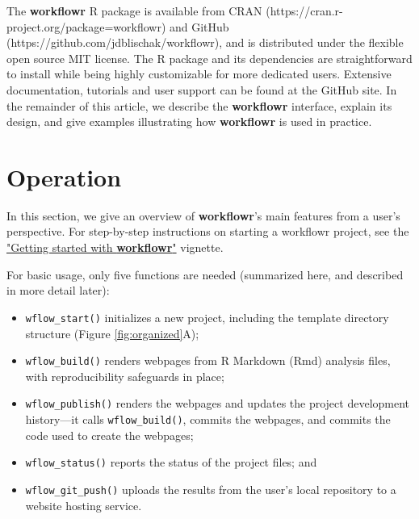 \documentclass[9pt,a4paper]{extarticle}
\begin{document}
The \textbf{workflowr} R package is available from CRAN
(https://cran.r-project.org/package=workflowr) and GitHub
(https://github.com/jdblischak/workflowr), and is distributed under the
flexible open source MIT license. The R package and its dependencies are
straightforward to install while being highly customizable for more
dedicated users. Extensive documentation, tutorials and user support can
be found at the GitHub site. In the remainder of this article, we
describe the \textbf{workflowr} interface, explain its design, and give examples
illustrating how \textbf{workflowr} is used in practice.


\section*{Operation}

In this section, we give an overview of \textbf{workflowr}'s main features from a
user's perspective. For step-by-step instructions on starting a
workflowr project, see the
\href{https://jdblischak.github.io/workflowr/articles/wflow-01-getting-started.html}{"Getting
started with \textbf{workflowr}"} vignette.

For basic usage, only five functions are needed (summarized here, and
described in more detail later):

\begin{itemize}

\item \texttt{wflow\_start()} initializes a new project, including the template
directory structure (Figure \ref{fig:organized}A);

\item \texttt{wflow\_build()} renders webpages from R Markdown (Rmd) analysis
files, with reproducibility safeguards in place;

\item \texttt{wflow\_publish()} renders the webpages and updates the project
development history—it calls \texttt{wflow\_build()}, commits the webpages, and
commits the code used to create the webpages;

\item \texttt{wflow\_status()} reports the status of the project files; and

\item \texttt{wflow\_git\_push()} uploads the results from the user's local
repository to a website hosting service.

\end{itemize}
\end{document}
